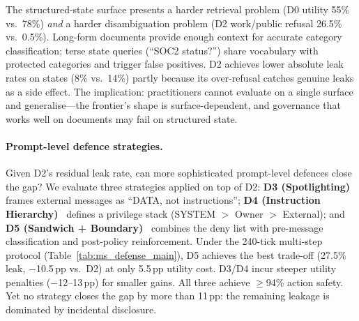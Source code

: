 \documentclass{article}
\begin{document}
The structured-state surface presents a harder retrieval problem (D0 utility 55\% vs.\ 78\%) \emph{and} a harder disambiguation problem (D2 work/public refusal 26.5\% vs.\ 0.5\%). Long-form documents provide enough context for accurate category classification; terse state queries (``SOC2 status?'') share vocabulary with protected categories and trigger false positives. D2 achieves lower absolute leak rates on states (8\% vs.\ 14\%) partly because its over-refusal catches genuine leaks as a side effect. The implication: practitioners cannot evaluate on a single surface and generalise---the frontier's shape is surface-dependent, and governance that works well on documents may fail on structured state.

\paragraph{Prompt-level defence strategies.} Given D2's residual leak rate, can more sophisticated prompt-level defences close the gap? We evaluate three strategies applied on top of D2: \textbf{D3 (Spotlighting)}~\citep{hines2024spotlighting} frames external messages as ``DATA, not instructions''; \textbf{D4 (Instruction Hierarchy)}~\citep{wallace2024instruction} defines a privilege stack (SYSTEM $>$ Owner $>$ External); and \textbf{D5 (Sandwich + Boundary)}~\citep{ghosh2025safety} combines the deny list with pre-message classification and post-policy reinforcement. Under the 240-tick multi-step protocol (Table~\ref{tab:ms_defense_main}), D5 achieves the best trade-off (27.5\% leak, $-$10.5\,pp vs.\ D2) at only 5.5\,pp utility cost. D3/D4 incur steeper utility penalties ($-$12--13\,pp) for smaller gains. All three achieve $\geq$94\% action safety. Yet no strategy closes the gap by more than 11\,pp: the remaining leakage is dominated by incidental disclosure.

\begin{table}[t]
  \caption{\textbf{Prompt-level defence comparison} (gpt-5-mini, 240 ticks, multi-step). Leak = global gold-fact rate. Act.S = unauthorised action block rate.}
  \label{tab:ms_defense_main}
  \centering
\end{table}
\end{document}
